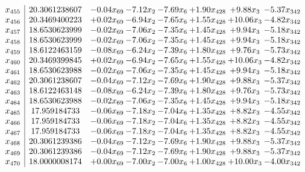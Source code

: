 \documentclass[8pt]{article}
\begin{document}
\[\begin{array}{c| c c@{\hskip 2pt} c@{\hskip 2pt} c@{\hskip 2pt} c@{\hskip 2pt} c@{\hskip 2pt} c@{\hskip 2pt} }
 x_{455}   &  20.3061238607 & -0.04 x_{69} & -7.12 x_{2} & -7.69 x_{6} & +  1.90 x_{428} & +  9.88 x_{3} & -5.37 x_{342}\\
 x_{456}   &  20.3469400223 & +  0.02 x_{69} & -6.94 x_{2} & -7.65 x_{6} & +  1.55 x_{428} & + 10.06 x_{3} & -4.82 x_{342}\\
 x_{457}   &  18.6530623999 & -0.02 x_{69} & -7.06 x_{2} & -7.35 x_{6} & +  1.45 x_{428} & +  9.94 x_{3} & -5.18 x_{342}\\
 x_{458}   &  18.6530623999 & -0.02 x_{69} & -7.06 x_{2} & -7.35 x_{6} & +  1.45 x_{428} & +  9.94 x_{3} & -5.18 x_{342}\\
 x_{459}   &  18.6122463159 & -0.08 x_{69} & -6.24 x_{2} & -7.39 x_{6} & +  1.80 x_{428} & +  9.76 x_{3} & -5.73 x_{342}\\
 x_{460}   &  20.3469399845 & +  0.02 x_{69} & -6.94 x_{2} & -7.65 x_{6} & +  1.55 x_{428} & + 10.06 x_{3} & -4.82 x_{342}\\
 x_{461}   &  18.6530623988 & -0.02 x_{69} & -7.06 x_{2} & -7.35 x_{6} & +  1.45 x_{428} & +  9.94 x_{3} & -5.18 x_{342}\\
 x_{462}   &  20.3061238607 & -0.04 x_{69} & -7.12 x_{2} & -7.69 x_{6} & +  1.90 x_{428} & +  9.88 x_{3} & -5.37 x_{342}\\
 x_{463}   &  18.6122463148 & -0.08 x_{69} & -6.24 x_{2} & -7.39 x_{6} & +  1.80 x_{428} & +  9.76 x_{3} & -5.73 x_{342}\\
 x_{464}   &  18.6530623988 & -0.02 x_{69} & -7.06 x_{2} & -7.35 x_{6} & +  1.45 x_{428} & +  9.94 x_{3} & -5.18 x_{342}\\
 x_{465}   &  17.959184733 & -0.06 x_{69} & -7.18 x_{2} & -7.04 x_{6} & +  1.35 x_{428} & +  8.82 x_{3} & -4.55 x_{342}\\
 x_{466}   &  17.959184733 & -0.06 x_{69} & -7.18 x_{2} & -7.04 x_{6} & +  1.35 x_{428} & +  8.82 x_{3} & -4.55 x_{342}\\
 x_{467}   &  17.959184733 & -0.06 x_{69} & -7.18 x_{2} & -7.04 x_{6} & +  1.35 x_{428} & +  8.82 x_{3} & -4.55 x_{342}\\
 x_{468}   &  20.3061239386 & -0.04 x_{69} & -7.12 x_{2} & -7.69 x_{6} & +  1.90 x_{428} & +  9.88 x_{3} & -5.37 x_{342}\\
 x_{469}   &  20.3061239386 & -0.04 x_{69} & -7.12 x_{2} & -7.69 x_{6} & +  1.90 x_{428} & +  9.88 x_{3} & -5.37 x_{342}\\
 x_{470}   &  18.0000008174 & +  0.00 x_{69} & -7.00 x_{2} & -7.00 x_{6} & +  1.00 x_{428} & + 10.00 x_{3} & -4.00 x_{342}\\

\end{array}\]
\end{document}
